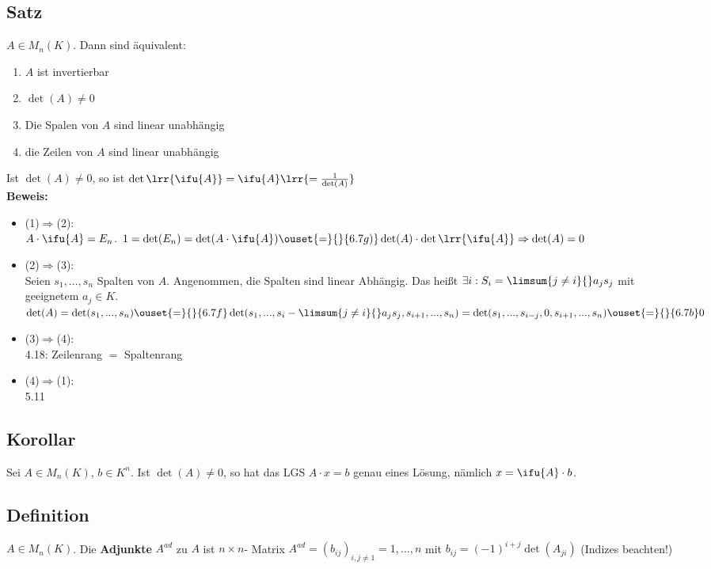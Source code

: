 \subsection{Satz}
  $A\in M_n(K)$. Dann sind äquivalent:
  \begin{enumerate}[(1)]
    \item $A$ ist invertierbar
    \item $\det(A)\neq 0$
    \item Die Spalen von $A$ sind linear unabhängig
    \item die Zeilen von $A$ sind linear unabhängig
  \end{enumerate}
  Ist $\det(A)\neq 0$, so ist $\det\lrr{\ifu{A}}=\ifu{A}\lrr{=\frac{1}{\det(A)}}$\\
  \textbf{Beweis:}
  \begin{itemize}
    \item (1)$\Rightarrow$(2):\\
      $A\cdot \ifu{A}=E_n$. $1=\det(E_n)=\det(A\cdot\ifu{A})\ouset{=}{}{6.7g)}\det(A)\cdot\det\lrr{\ifu{A}}\\
      \Rightarrow\det(A)=0$
    \item (2)$\Rightarrow$(3):\\
      Seien $s_1,...,s_n$ Spalten von $A$. Angenommen, die Spalten sind linear
      Abhängig. Das heißt $\exists i: S_i=\limsum{j\neq i}{}a_js_j$ mit
      geeignetem $a_j\in K$.\\
      $\det(A)=\det(s_1,...,s_n)\ouset{=}{}{6.7f}\det(s_1,...,s_i-\limsum{j\neq
      i}{}a_js_j,s_{i+1},...,s_n)=\det(s_1,...,s_{i-j},0,s_{i+1},...,s_n)\ouset{=}{}{6.7b}0$\lightning
    \item (3)$\Rightarrow$(4):\\
      4.18: Zeilenrang $=$ Spaltenrang
    \item (4)$\Rightarrow$(1):\\
      5.11
  \end{itemize}

\subsection{Korollar}
Sei $A\in M_n(K)$, $b\in K^n$. Ist $\det(A)\neq 0$, so hat das LGS $A\cdot x=b$
genau eines Lösung, nämlich $x=\ifu{A}\cdot b$.

\subsection{Definition}
$A\in M_n(K)$. Die \textbf{Adjunkte} $A^{ad}$ zu $A$ ist $n\times n$- Matrix
$A^{ad}=(b_{ij})_{i,j\neq 1}=1,...,n$ mit $b_{ij}=(-1)^{i+j}\det(A_{ji})$
(Indizes beachten!)

